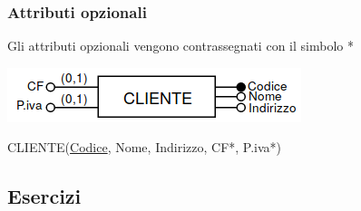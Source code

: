\documentclass[a4paper]{article}
\begin{document}
\subsubsection{Attributi opzionali}
Gli attributi opzionali vengono contrassegnati con il simbolo *
\begin{center}
      \includegraphics[scale=0.5]{img/pl12.png}
\end{center}
%
CLIENTE(\underline{Codice}, Nome, Indirizzo, CF*, P.iva*)

\subsection{Esercizi}
\end{document}
